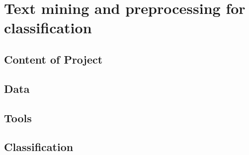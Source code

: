 


\chapter{Text mining and preprocessing for classification} \label{cha:ml3}
    \section{Content of Project} 
        \label{sec:ml3_content}
    

    \section{Data} 
        \label{sec:ml3_data}
    

    \section{Tools} %
    \label{sub:Tools}
    

    \section{Classification} %
    \label{sec:Classification}
    



